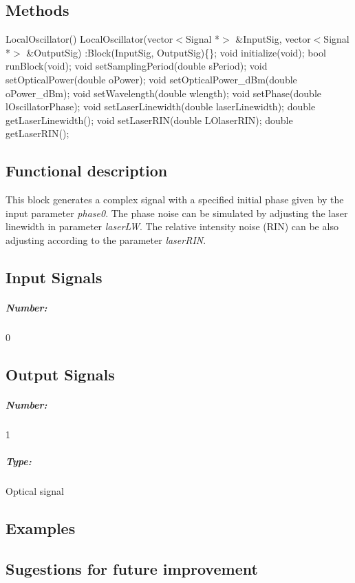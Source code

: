 \subsection*{Methods}

LocalOscillator() {}
\bigbreak
LocalOscillator(vector$<$Signal *$>$ \&InputSig, vector$<$Signal *$>$ \&OutputSig) :Block(InputSig, OutputSig)\{\};
\bigbreak
void initialize(void);
\bigbreak
bool runBlock(void);
\bigbreak
void setSamplingPeriod(double sPeriod);
\bigbreak
void setOpticalPower(double oPower);
\bigbreak
void setOpticalPower\_dBm(double oPower\_dBm);
\bigbreak
void setWavelength(double wlength);
\bigbreak
void setPhase(double lOscillatorPhase);
\bigbreak
void setLaserLinewidth(double laserLinewidth);
\bigbreak
double getLaserLinewidth();
\bigbreak
void setLaserRIN(double LOlaserRIN);
\bigbreak
double getLaserRIN();

\subsection*{Functional description}

This block generates a complex signal with a specified initial phase given by the input parameter \textit{phase0}. The phase noise can be simulated by adjusting the laser linewidth in parameter \textit{laserLW}. The relative intensity noise (RIN) can be also adjusting according to the parameter \textit{laserRIN}.

\pagebreak
\subsection*{Input Signals}

\subparagraph*{Number:} 0

\subsection*{Output Signals}

\subparagraph*{Number:} 1

\subparagraph*{Type:} Optical signal

\subsection*{Examples}

\subsection*{Sugestions for future improvement}


